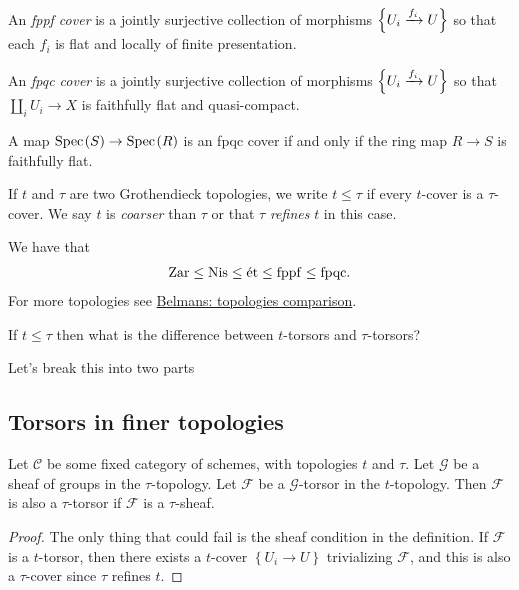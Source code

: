 \documentclass[11pt,openany]{book}
\begin{document}
\begin{example} \cite[021M]{Stacks} An \textit{fppf cover} is a jointly surjective collection of morphisms $\left\{ U_i \xrightarrow{f_i} U \right\}$ so that each $f_i$ is flat and locally of finite presentation.
\end{example}

\begin{example} \cite[03NW]{Stacks} An \textit{fpqc cover} is a jointly surjective collection of morphisms $\left\{ U_i \xrightarrow{f_i} U \right\}$ so that $\amalg_i U_i \to X$ is faithfully flat and quasi-compact.
\end{example}

\begin{example} A map $\text{Spec}\hspace{0.1em}(S) \to \text{Spec}\hspace{0.1em}(R)$ is an fpqc cover if and only if the ring map $R\to S$ is faithfully flat.
\end{example}



\begin{terminology} If $t$ and $\tau$ are two Grothendieck topologies, we write $t\le \tau$ if every $t$-cover is a $\tau$-cover. We say $t$ is \textit{coarser} than $\tau$ or that $\tau$ \textit{refines} $t$ in this case.
\end{terminology}

\begin{proposition} We have that
\begin{align*}
    \mathrm{Zar} \le \mathrm{Nis} \le \text{\'{e}t} \le \mathrm{fppf} \le \mathrm{fpqc}.
\end{align*}
For more topologies see \href{https://pbelmans.ncag.info/topologies-comparison/}{Belmans: topologies comparison}.
\end{proposition}

\begin{question} If $t \le \tau$ then what is the difference between $t$-torsors and $\tau$-torsors?
\end{question}

Let's break this into two parts

\subsection{Torsors in finer topologies}

\begin{proposition}\label{prop:torsor-in-finer-topology-if-sheaf} 
Let $\mathscr{C}$ be some fixed category of schemes, with topologies $t$ and $\tau$. Let $\mathcal{G}$ be a sheaf of groups in the $\tau$-topology. Let $\mathcal{F}$ be a $\mathcal{G}$-torsor in the $t$-topology. Then $\mathcal{F}$ is also a $\tau$-torsor if $\mathcal{F}$ is a $\tau$-sheaf.
\end{proposition}
\begin{proof} The only thing that could fail is the sheaf condition in the definition. If $\mathcal{F}$ is a $t$-torsor, then there exists a $t$-cover $\left\{ U_i \to U \right\}$ trivializing $\mathcal{F}$, and this is also a $\tau$-cover since $\tau$ refines $t$. 
\end{proof}
\end{document}
